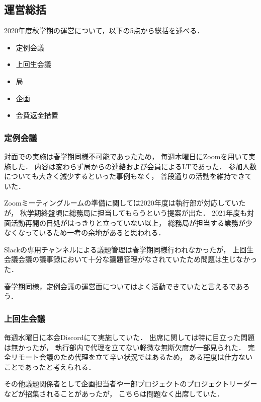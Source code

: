 \subsection*{運営総括}


2020年度秋学期の運営について，以下の5点から総括を述べる．
\begin{itemize}
  \item 定例会議
  \item 上回生会議
  \item 局
  \item 企画
  \item 会費返金措置
\end{itemize}

\subsubsection*{定例会議}
対面での実施は春学期同様不可能であったため，
毎週木曜日にZoomを用いて実施した．
内容は変わらず局からの連絡および会員によるLTであった．
参加人数についても大きく減少するといった事例もなく，
普段通りの活動を維持できていた．

Zoomミーティングルームの準備に関しては2020年度は執行部が対応していたが，
秋学期終盤頃に総務局に担当してもらうという提案が出た．
2021年度も対面活動再開の目処がはっきりと立っていない以上，
総務局が担当する業務が少なくなっているため一考の余地があると思われる．

Slackの専用チャンネルによる議題管理は春学期同様行われなかったが，
上回生会議会議の議事録において十分な議題管理がなされていたため問題は生じなかった．

春学期同様，定例会議の運営面についてはよく活動できていたと言えるであろう．

\subsubsection*{上回生会議}
毎週水曜日に本会Discordにて実施していた．
出席に関しては特に目立った問題は無かったが，
執行部内で代理を立てない軽微な無断欠席が一部見られた．
完全リモート会議のため代理を立て辛い状況ではあるため，
ある程度は仕方ないことであったと考えられる．

その他議題関係者として企画担当者や一部プロジェクトのプロジェクトリーダーなどが招集されることがあったが，
こちらは問題なく出席していた．

